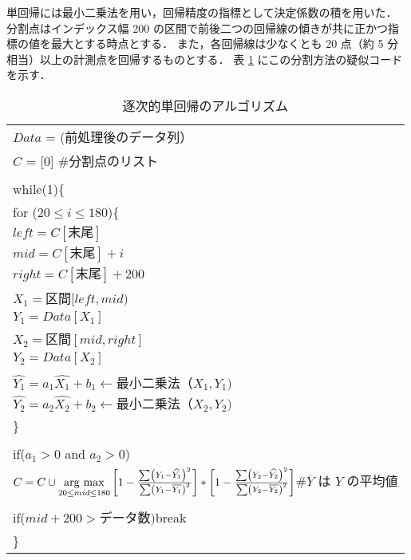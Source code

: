 \documentclass[a4j]{jarticle}
\newcommand{\argmax}{\mathop{\rm arg~max}\limits}
\begin{document}
単回帰には最小二乗法を用い，回帰精度の指標として決定係数の積を用いた．
分割点はインデックス幅 200 の区間で前後二つの回帰線の傾きが共に正かつ指標の値を最大とする時点とする．
また，各回帰線は少なくとも 20 点（約 5 分相当）以上の計測点を回帰するものとする．
表 \ref{alg1} にこの分割方法の疑似コードを示す．\\
\begin{table}[tb]
\caption{逐次的単回帰のアルゴリズム}
\label{alg1}
\begin{tabular}{l}
\hline
$Data$ = (前処理後のデータ列）\\
$C$ = [0] \hspace{1cm}\#分割点のリスト\\
\\
while(1)\{\\
\hspace{0.5cm}for ($20 \leq i \leq 180$)\{\\
\hspace{1cm}$left = C[末尾]$\\
\hspace{1cm}$mid = C[末尾] + i$\\
\hspace{1cm}$right = C[末尾] + 200$\\
\\
\hspace{1cm}$X_1 = 区間 [left, mid)$\\
\hspace{1cm}$Y_1 = Data[X_1]$\\
\\
\hspace{1cm}$X_2 = 区間 [mid, right]$\\
\hspace{1cm}$Y_2 = Data[X_2]$\\
\\
\hspace{1cm}$\widehat{Y_1} = a_1\widehat{X_1} + b_1 \leftarrow 最小二乗法（X_1,Y_1)$\\
\hspace{1cm}$\widehat{Y_2} = a_2\widehat{X_2} + b_2 \leftarrow 最小二乗法（X_2,Y_2)$\\
\hspace{0.5cm}\}\\
\\
\hspace{0.5cm}if($a_1>0$ and $a_2>0$)\\
\hspace{1cm}$C = C \cup \argmax_{20\leq mid \leq 180} \left[1-\frac{\sum \left(Y_1 - \widehat{Y_1}\right)^2}{\sum \left(Y_1 - \overline{Y_1}\right)^2} \right] * \left[1-\frac{\sum \left(Y_2 - \widehat{Y_2}\right)^2}{\sum \left(Y_2 - \overline{Y_2}\right)^2} \right]$\hspace{1cm}$\#\overline{Y}$ は $Y$ の平均値\\
\\
\hspace{0.5cm}if($mid + 200 > データ数)$\hspace{1cm}break\\
\}
\end{tabular}
\end{table}
\end{document}
